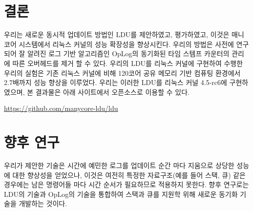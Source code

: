 
\section{결론}
\label{sec:concl}
우리는 새로운 동시적 업데이트 방법인 LDU를 제안하였고, 평가하였고, 
이것은 매니코어 시스템에서 리눅스 커널의 성능 확장성을 향상시킨다.
우리의 방법은 사전에 연구되어 잘 알려진 로그 기반 알고리즘인 OpLog의 동기화된 타임
 스템프 카운터의 관리에 따른 오버헤드를 제거 할 수 있다. 
우리의 LDU를 리눅스 커널에 구현하여 수행한 우리의 실험은 기존 리눅스 커널에 비해 120코어 
공유 메모리 기반 컴퓨팅 환경에서 2.7배까지 성능 향상을 이루었다. 
우리는 이러한 LDU를 리눅스 커널 4.5-rc6에 구현하였으며, 본 결과물은
아래 사이트에서 오픈소스로 이용할 수 있다.
\begin{center}
\url{https://github.com/manycore-ldu/ldu}
\end{center}

\newpage
\section{향후 연구}
우리가 제안한 기술은 시간에 예민한 로그를 업데이트 순간 마다 지움으로
 상당한 성능에 대한 향상성을 얻었으나, 이것은 여전히 특정한 자료구조(예를 들어 스택, 큐)
  같은 경우에는 남은 명령어들 마다 시간 순서가 필요하므로 적용하지 못한다.
향후 연구로는 LDU의 기술과 OpLog의 기술을 통합하여 스택과 큐를 지원학 위해
 새로운 동기화 기술을 개발하는 것이다. 


